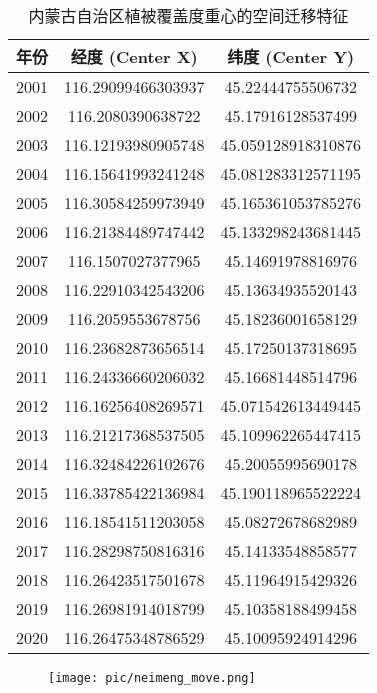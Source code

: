 \documentclass{article}
\begin{document}
		\begin{table}[H] 
			\centering
			\begin{tabular}{|c|c|c|}
				\hline
				\textbf{年份} & \textbf{经度 (Center X)} & \textbf{纬度 (Center Y)} \\
				\hline
				2001 & 116.29099466303937 & 45.22444755506732 \\
				2002 & 116.2080390638722 & 45.17916128537499 \\
				2003 & 116.12193980905748 & 45.059128918310876 \\
				2004 & 116.15641993241248 & 45.081283312571195 \\
				2005 & 116.30584259973949 & 45.165361053785276 \\
				2006 & 116.21384489747442 & 45.133298243681445 \\
				2007 & 116.1507027377965 & 45.14691978816976 \\
				2008 & 116.22910342543206 & 45.13634935520143 \\
				2009 & 116.2059553678756 & 45.18236001658129 \\
				2010 & 116.23682873656514 & 45.17250137318695 \\
				2011 & 116.24336660206032 & 45.16681448514796 \\
				2012 & 116.16256408269571 & 45.071542613449445 \\
				2013 & 116.21217368537505 & 45.109962265447415 \\
				2014 & 116.32484226102676 & 45.20055995690178 \\
				2015 & 116.33785422136984 & 45.190118965522224 \\
				2016 & 116.18541511203058 & 45.08272678682989 \\
				2017 & 116.28298750816316 & 45.14133548858577 \\
				2018 & 116.26423517501678 & 45.11964915429326 \\
				2019 & 116.26981914018799 & 45.10358188499458 \\
				2020 & 116.26475348786529 & 45.10095924914296 \\
				\hline
			\end{tabular}
			\caption{内蒙古自治区植被覆盖度重心的空间迁移特征}
		\end{table}
								\begin{figure}[H]  %
			\centering
			\texttt{[image: pic/neimeng\_move.png]} %
		\end{figure}
		
\end{document}
